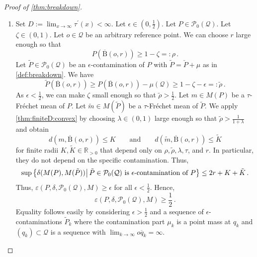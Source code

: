 \documentclass{article}
\newcommand*{\mc}[1]{\mathcal{#1}}
\newcommand{\R}{\mathbb{R}}
\newcommand{\Rpp}{\R_{>0}}
\newcommand{\ball}{\mathrm{B}}
\newcommand{\lcb}{\left\lbrace} %
\newcommand{\rcb}{\right\rbrace} %
\newcommand{\cb}[1]{\lcb #1 \rcb} %
\newcommand{\sizedMid}[2]{#1 \, \kern-\nulldelimiterspace\mathopen{}\left| \vphantom{#1}\,#2\right.\mathclose{}\kern-\nulldelimiterspace}
\newcommand{\setByEle}[2]{\cb{\sizedMid{#1}{#2}}}
\newcommand{\pr}{^\prime}
\newcommand{\eqfs}{\,.}
\newcommand{\ol}[2]{\overline{#1#2}}
\newcommand{\tran}{\tau}
\newcommand{\dtran}{\tau\pr}
\newcommand{\ballclosed}{\overline{\ball}}
\begin{document}
\begin{proof}[Proof of \cref{thm:breakdown}]
    \begin{enumerate}[label=(\roman*)]
        \item
        Set $D := \lim_{x\to\infty}\dtran(x) < \infty$.
        Let $\epsilon\in(0,\frac12)$.
        Let $P \in \mc P_0(\mc Q)$.
        Let $\zeta \in (0,1)$.
        Let $o\in\mc Q$ be an arbitrary reference point. We can choose $r$ large enough so that 
        \begin{equation}
            P(\ballclosed(o, r)) \geq  1 - \zeta =: \rho
            \eqfs
        \end{equation}
        Let $\tilde P \in \mc P_0(\mc Q)$ be an $\epsilon$-contamination of $P$ with $\tilde P = \check P + \mu$ as in \cref{def:breakdown}.
        We have
        \begin{equation}
            \tilde P(\ballclosed(o, r)) \geq P(\ballclosed(o, r)) - \mu(\mc Q) \geq 1 - \zeta - \epsilon =: \tilde\rho
            \eqfs
        \end{equation}
        As $\epsilon < \frac12$, we can make $\zeta$ small enough so that $\tilde\rho > \frac12$.
        Let $m \in M(P)$ be a $\tran$-Fr\'echet mean of $P$.
        Let $\tilde m \in M(\tilde P)$ be a $\tran$-Fr\'echet mean of $\tilde P$.
        We apply \cref{thm:finiteD:convex} by choosing $\lambda\in(0,1)$ large enough so that $\tilde\rho > \frac{1}{1+\lambda}$ and obtain
        \begin{equation}
            d(m, \ballclosed(o, r)) \leq K \qquad\text{and}\qquad d(\tilde m, \ballclosed(o, r)) \leq \tilde K
        \end{equation}
        for finite radii $K, \tilde K \in \Rpp$ that depend only on $\rho,\tilde\rho,\lambda,\tran$, and $r$. In particular, they do not depend on the specific contamination.
        Thus, 
        \begin{equation}
            \sup\setByEle{\delta(M(P), M(\tilde P))}{\tilde P \in \mc P_0(\mc Q) \text{ is } \epsilon\text{-contamination of } P} \leq 2r + K + \tilde K
            \eqfs
        \end{equation}
        Thus, $\varepsilon(P, \delta, \mc P_0(\mc Q), M) \geq \epsilon$ for all $\epsilon < \frac12$. Hence,
        \begin{equation}
            \varepsilon(P, \delta, \mc P_0(\mc Q), M) \geq \frac12
            \eqfs
        \end{equation}
        Equality follows easily by considering $\epsilon > \frac12$ and a sequence of $\epsilon$-contaminations $\tilde P_k$ where the contamination part $\mu_k$ is a point mass at $q_k$ and $(q_k)\subset \mc Q$ is a sequence with $\lim_{k\to\infty} \ol o{q_k} = \infty$.

\end{enumerate}
\end{proof}
\end{document}

